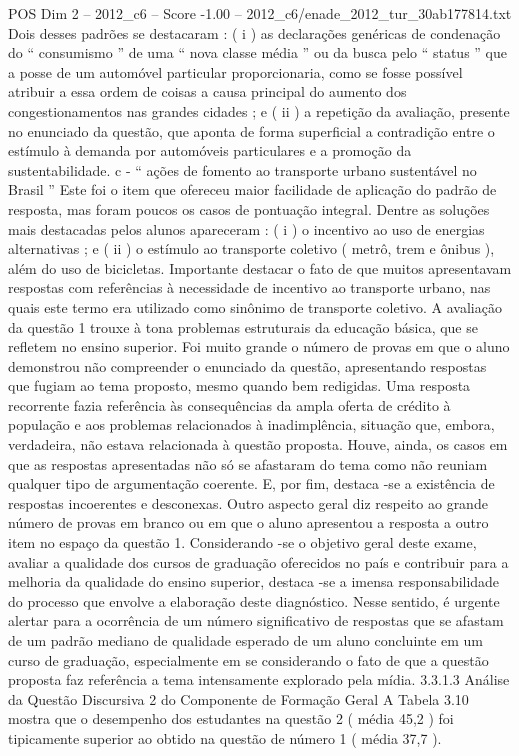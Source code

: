 \begin{textsample}{POS Dim 2 – 2012\_c6 – Score -1.00 – 2012\_c6/enade\_2012\_tur\_30ab177814.txt}
Dois desses padrões se destacaram : ( i ) as declarações genéricas de condenação do “ consumismo ” de uma “ nova classe média ” ou da busca pelo “ status ” que a posse de um automóvel particular proporcionaria, como se fosse possível atribuir a essa ordem de coisas a causa principal do aumento dos congestionamentos nas grandes cidades ; e ( ii ) a repetição da avaliação, presente no enunciado da questão, que aponta de forma superficial a contradição entre o estímulo à demanda por automóveis particulares e a promoção da sustentabilidade. c - “ ações de fomento ao transporte urbano sustentável no Brasil ” Este foi o item que ofereceu maior facilidade de aplicação do padrão de resposta, mas foram poucos os casos de pontuação integral.
Dentre as soluções mais destacadas pelos alunos apareceram : ( i ) o incentivo ao uso de energias alternativas ; e ( ii ) o estímulo ao transporte coletivo ( metrô, trem e ônibus ), além do uso de bicicletas.
Importante destacar o fato de que muitos apresentavam respostas com referências à necessidade de incentivo ao transporte urbano, nas quais este termo era utilizado como sinônimo de transporte coletivo.
A avaliação da questão 1 trouxe à tona problemas estruturais da educação básica, que se refletem no ensino superior.
Foi muito grande o número de provas em que o aluno demonstrou não compreender o enunciado da questão, apresentando respostas que fugiam ao tema proposto, mesmo quando bem redigidas.
Uma resposta recorrente fazia referência às consequências da ampla oferta de crédito à população e aos problemas relacionados à inadimplência, situação que, embora, verdadeira, não estava relacionada à questão proposta.
Houve, ainda, os casos em que as respostas apresentadas não só se afastaram do tema como não reuniam qualquer tipo de argumentação coerente.
E, por fim, destaca -se a existência de respostas incoerentes e desconexas.
Outro aspecto geral diz respeito ao grande número de provas em branco ou em que o aluno apresentou a resposta a outro item no espaço da questão 1.
Considerando -se o objetivo geral deste exame, avaliar a qualidade dos cursos de graduação oferecidos no país e contribuir para a melhoria da qualidade do ensino superior, destaca -se a imensa responsabilidade do processo que envolve a elaboração deste diagnóstico.
Nesse sentido, é urgente alertar para a ocorrência de um número significativo de respostas que se afastam de um padrão mediano de qualidade esperado de um aluno concluinte em um curso de graduação, especialmente em se considerando o fato de que a questão proposta faz referência a tema intensamente explorado pela mídia. 3.3.1.3 Análise da Questão Discursiva 2 do Componente de Formação Geral A Tabela 3.10 mostra que o desempenho dos estudantes na questão 2 ( média 45,2 ) foi tipicamente superior ao obtido na questão de número 1 ( média 37,7 ).

\end{textsample}
